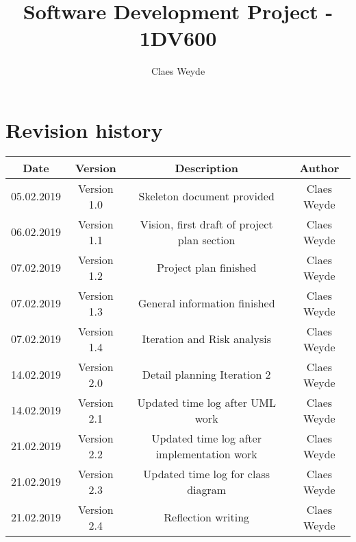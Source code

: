 \documentclass[12pt, letterpaper]{article}
\title{Software Development Project - 1DV600}
\author{Claes Weyde}
\begin{document}
\maketitle
\newpage
\tableofcontents{}
\newpage

\section{Revision history}
\begin{center}
	\begin{tabular}{|c|c|c|c|} 
		\hline
		Date & Version & Description & Author \\ [0.5ex] 
		\hline\hline
		05.02.2019 & Version 1.0 & Skeleton document provided & Claes Weyde \\
		\hline
		06.02.2019 & Version 1.1 & Vision, first draft of project plan section & 
		Claes Weyde \\
		\hline
		07.02.2019 & Version 1.2 & Project plan finished & Claes Weyde \\ [1ex] 
		\hline
		07.02.2019 & Version 1.3 & General information finished & Claes Weyde \\
		\hline
		07.02.2019 & Version 1.4 & Iteration and Risk analysis & Claes Weyde \\ 
		\hline
		14.02.2019 & Version 2.0 & Detail planning Iteration 2 & Claes Weyde \\
		\hline
		14.02.2019 & Version 2.1 & Updated time log after UML work & Claes Weyde \\
		\hline
		21.02.2019 & Version 2.2 & Updated time log after implementation work & Claes Weyde \\
		\hline
		21.02.2019 & Version 2.3 & Updated time log for class diagram & Claes Weyde \\
		\hline
		21.02.2019 & Version 2.4 & Reflection writing & Claes Weyde \\
		[1ex]
		\hline
		
	\end{tabular}
\end{center}
\newpage
\end{document}
